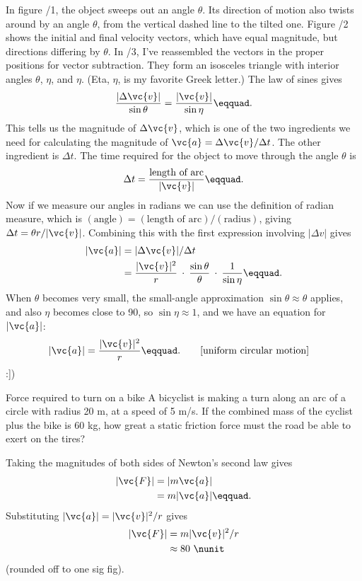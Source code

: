 In figure /1, the object sweeps out an angle $\theta $. Its
direction of motion also twists around by an angle $\theta$,
from the vertical dashed line to the tilted one. Figure
/2
shows the initial and final velocity vectors, which have
equal magnitude, but directions differing by $\theta $. In
/3,
I've reassembled the vectors in the proper
positions for vector subtraction. They form an isosceles
triangle with interior angles $\theta$, $\eta$, and $\eta$.
(Eta, $\eta$, is my favorite Greek letter.) The law of sines gives
\begin{equation*}
  \frac{|\Delta\vc{v}|}{\sin\theta} = \frac{|\vc{v}|}{\sin\eta}\eqquad.
\end{equation*}
This tells us the magnitude of $\Delta \vc{v}$, which is one of
the two ingredients we need for calculating the magnitude of
$\vc{a}=\Delta\vc{v}/\Delta t$. The other ingredient is $\Delta t$.
The time required for the object to move through the angle $\theta $ is
\begin{equation*}
  \Delta t = \frac{\text{length of arc}}{|\vc{v}|}\eqquad.
\end{equation*}
Now if we measure our angles in radians we can use the
definition of radian measure, which is 
$(\text{angle})=(\text{length of arc})/(\text{radius})$,
 giving $\Delta t=\theta r/|\vc{v}|$. Combining this
with the first expression involving $|\Delta v|$ gives
\begin{align*}
        |\vc{a}|     &=  |\Delta \vc{v}|/\Delta t  \\
             &=   \frac{|\vc{v}|^2}{r} \: \cdot \: \frac{\sin\theta}{\theta} \: \cdot \: \frac{1}{\sin\eta}\eqquad.
\end{align*}
When $\theta $ becomes very small, the small-angle
approximation $\sin \theta\approx \theta$ applies, and also $\eta $ becomes
close to 90\degunit, so $\sin  \eta \approx 1$, and we have an equation for $|\vc{a}|$:
\begin{equation*}
                |\vc{a}|  =  \frac{|\vc{v}|^2}{r}\eqquad. \qquad \shoveright{\text{[uniform circular motion]}}
\end{equation*}
:])

\begin{eg}{Force required to turn on a bike}
\egquestion A bicyclist is making a turn along an arc of a
circle with radius 20 m, at a speed of 5 m/s. If the
combined mass of the cyclist plus the bike is 60 kg, how
great a static friction force must the road be able
to exert on the tires?

\eganswer Taking the magnitudes of both sides of Newton's second law gives
\begin{align*}
        |\vc{F}|     &=  |m\vc{a}|  \\
             &=  m|\vc{a}|\eqquad.
\end{align*}
Substituting $|\vc{a}|=|\vc{v}|^2/r$ gives
\begin{align*}
        |\vc{F}|     &= m|\vc{v}|^2/r \\
                     &\approx 80\ \nunit
\end{align*}
(rounded off to one sig fig).
\end{eg}


